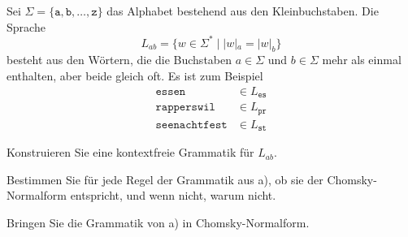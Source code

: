Sei $\Sigma=\{\texttt{a},\texttt{b},\dots,\texttt{z}\}$ das Alphabet
bestehend aus den Kleinbuchstaben.
Die Sprache
\[
L_{ab}=\{w\in\Sigma^*\;|\; |w|_a=|w|_b\}
\]
besteht aus den Wörtern, die die Buchstaben $a\in \Sigma$ und $b\in\Sigma$
mehr als einmal enthalten, aber beide gleich oft.
Es ist zum Beispiel
\begin{align*}
\texttt{essen}&\in L_{\texttt{es}}\\
\texttt{rapperswil}&\in L_{\texttt{pr}}\\
\texttt{seenachtfest}&\in L_{\texttt{st}}
\end{align*}
\begin{teilaufgaben}
\item
Konstruieren Sie eine kontextfreie Grammatik für $L_{ab}$.
\item
Bestimmen Sie für jede Regel der Grammatik aus a), ob sie der
Chomsky-Normalform entspricht, und wenn nicht, warum nicht.
\item
Bringen Sie die Grammatik von a) in Chomsky-Normalform.
\end{teilaufgaben}


